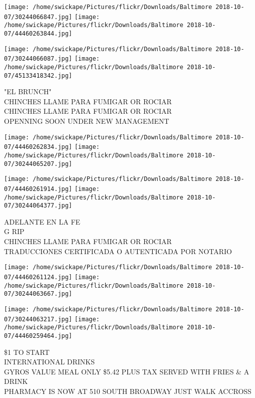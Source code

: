 \documentclass[10pt,letterpaper]{article}
\begin{document}
\texttt{[image: /home/swickape/Pictures/flickr/Downloads/Baltimore 2018-10-07/30244066847.jpg]}
\texttt{[image: /home/swickape/Pictures/flickr/Downloads/Baltimore 2018-10-07/44460263844.jpg]}

\texttt{[image: /home/swickape/Pictures/flickr/Downloads/Baltimore 2018-10-07/30244066087.jpg]}
\texttt{[image: /home/swickape/Pictures/flickr/Downloads/Baltimore 2018-10-07/45133418342.jpg]}

"EL BRUNCH"\\
CHINCHES LLAME PARA FUMIGAR OR ROCIAR\\
CHINCHES LLAME PARA FUMIGAR OR ROCIAR\\
OPENNING SOON UNDER NEW MANAGEMENT\\
\pagebreak

\texttt{[image: /home/swickape/Pictures/flickr/Downloads/Baltimore 2018-10-07/44460262834.jpg]}
\texttt{[image: /home/swickape/Pictures/flickr/Downloads/Baltimore 2018-10-07/30244065207.jpg]}

\texttt{[image: /home/swickape/Pictures/flickr/Downloads/Baltimore 2018-10-07/44460261914.jpg]}
\texttt{[image: /home/swickape/Pictures/flickr/Downloads/Baltimore 2018-10-07/30244064377.jpg]}

ADELANTE EN LA FE\\
G RIP\\
CHINCHES LLAME PARA FUMIGAR OR ROCIAR\\
TRADUCCIONES CERTIFICADA O AUTENTICADA POR NOTARIO\\
\pagebreak

\texttt{[image: /home/swickape/Pictures/flickr/Downloads/Baltimore 2018-10-07/44460261124.jpg]}
\texttt{[image: /home/swickape/Pictures/flickr/Downloads/Baltimore 2018-10-07/30244063667.jpg]}

\texttt{[image: /home/swickape/Pictures/flickr/Downloads/Baltimore 2018-10-07/30244063217.jpg]}
\texttt{[image: /home/swickape/Pictures/flickr/Downloads/Baltimore 2018-10-07/44460259464.jpg]}

\$1 TO START\\
INTERNATIONAL DRINKS\\
GYROS VALUE MEAL ONLY \$5.42 PLUS TAX SERVED WITH FRIES \& A DRINK\\
PHARMACY IS NOW AT 510 SOUTH BROADWAY JUST WALK ACCROSS\\
\pagebreak
\end{document}
